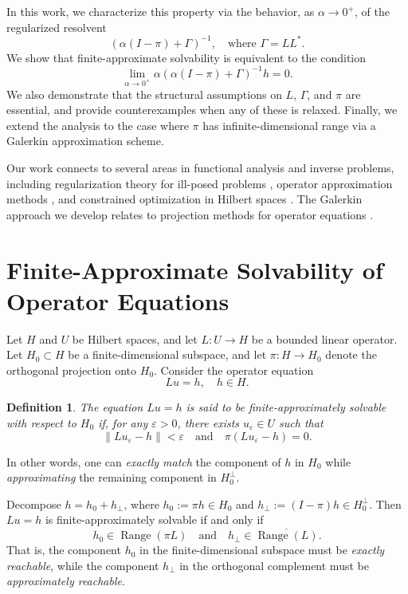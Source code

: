 \documentclass[12pt]{article}
\newtheorem{definition}[theorem]{Definition}
\DeclareMathOperator{\Range}{Range}
\begin{document}
	In this work, we characterize this property via the behavior, as \(\alpha \to 0^+\), of the regularized resolvent
	\[
	(\alpha(I - \pi) + \Gamma)^{-1}, \quad \text{where } \Gamma = LL^*.
	\]
	We show that finite-approximate solvability is equivalent to the condition
	\[
	\lim_{\alpha \to 0^+} \alpha(\alpha(I - \pi) + \Gamma)^{-1}h = 0.
	\]
	We also demonstrate that the structural assumptions on \(L\), \(\Gamma\), and \(\pi\) are essential, and provide counterexamples when any of these is relaxed. Finally, we extend the analysis to the case where \(\pi\) has infinite-dimensional range via a Galerkin approximation scheme.
	
	Our work connects to several areas in functional analysis and inverse problems, including regularization theory for ill-posed problems \cite{tikhonov1963solution, engl1996regularization}, operator approximation methods \cite{kress1999linear, nair2009}, and constrained optimization in Hilbert spaces \cite{luenberger1969optimization}. The Galerkin approach we develop relates to projection methods for operator equations \cite{bakushinskii2011iterative, kirsch2011introduction}.
	
	\section{Finite-Approximate Solvability of Operator Equations}
	
	Let \(H\) and \(U\) be Hilbert spaces, and let \(L:U \to H\) be a bounded linear operator. Let \(H_0 \subset H\) be a finite-dimensional subspace, and let \(\pi: H \to H_0\) denote the orthogonal projection onto \(H_0\). Consider the operator equation
	\[
	L u = h, \quad h \in H.
	\]
	
	\begin{definition}
		The equation \(L u = h\) is said to be \emph{finite-approximately solvable with respect to \(H_0\)} if, for any \(\varepsilon > 0\), there exists \(u_\varepsilon \in U\) such that
		\[
		\|L u_\varepsilon - h\| < \varepsilon \quad \text{and} \quad \pi (L u_\varepsilon - h) = 0.
		\]
	\end{definition}
	
	In other words, one can \emph{exactly match} the component of \(h\) in \(H_0\) while \emph{approximating} the remaining component in \(H_0^\perp\).
	
	Decompose \(h = h_0 + h_\perp\), where \(h_0 := \pi h \in H_0\) and \(h_\perp := (I-\pi)h \in H_0^\perp\). Then \(L u = h\) is finite-approximately solvable if and only if
	\[
	h_0 \in \Range(\pi L) \quad \text{and} \quad h_\perp \in \overline{\Range(L)}.
	\]
	That is, the component \(h_0\) in the finite-dimensional subspace must be \emph{exactly reachable}, while the component \(h_\perp\) in the orthogonal complement must be \emph{approximately reachable}.
	
\end{document}
